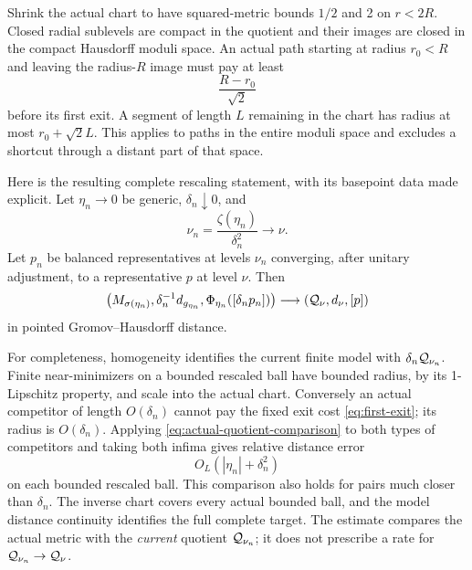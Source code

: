 Shrink the actual chart to have squared-metric
bounds $1/2$ and 2 on $r<2R$. Closed radial
sublevels are compact in the quotient and their
images are closed in the compact Hausdorff
moduli space. An actual path starting at radius
$r_0<R$ and leaving the radius-$R$ image must
pay at least
\begin{equation}\label{eq:first-exit}
 \frac{R-r_0}{\sqrt2}
\end{equation}
before its first exit. A segment of length $L$
remaining in the chart has radius at most
$r_0+\sqrt2L$. This applies to paths in the entire
moduli space and excludes a shortcut through
a distant part of that space.

Here is the resulting complete rescaling
statement, with its basepoint data made explicit.
Let $\eta_n\to0$ be generic, $\delta_n\downarrow0$,
and
\begin{equation}\label{eq:first-rescaling-data}
 \nu_n=\frac{\zeta(\eta_n)}{\delta_n^2}\longrightarrow\nu.
\end{equation}
Let $p_n$ be balanced representatives at levels
$\nu_n$ converging, after unitary adjustment,
to a representative $p$ at level $\nu$. Then
\begin{equation}\label{eq:first-rescaling-limit}
 \bigl(M_{\sigma(\eta_n)},\delta_n^{-1}d_{g_{\eta_n}},
       \Phi_{\eta_n}([\delta_np_n])\bigr)
 \longrightarrow(\mathcal Q_\nu,d_\nu,[p])
\end{equation}
in pointed Gromov--Hausdorff distance.

For completeness, homogeneity identifies the
current finite model with $\delta_n\mathcal Q_{\nu_n}$.
Finite near-minimizers on a bounded rescaled
ball have bounded radius, by its 1-Lipschitz
property, and scale into the actual chart.
Conversely an actual competitor of length
$O(\delta_n)$ cannot pay the fixed exit cost
\eqref{eq:first-exit}; its radius is
$O(\delta_n)$. Applying
\eqref{eq:actual-quotient-comparison} to both
types of competitors and taking both infima
gives relative distance error
\begin{equation}\label{eq:rescaled-relative-error}
 O_L(|\eta_n|+\delta_n^2)
\end{equation}
on each bounded rescaled ball. This comparison
also holds for pairs much closer than
$\delta_n$. The inverse chart covers every
actual bounded ball, and the model distance
continuity identifies the full complete target.
The estimate compares the actual metric with
the \emph{current} quotient $\mathcal Q_{\nu_n}$;
it does not prescribe a rate for
$\mathcal Q_{\nu_n}\to\mathcal Q_\nu$.

